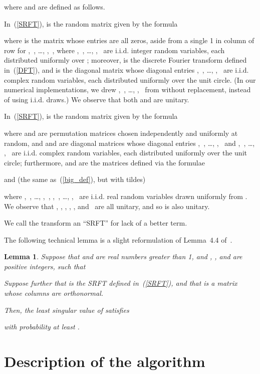 \documentclass[letterpaper,12pt]{article}
\newtheorem{lemma}[theorem]{Lemma}
\begin{document}
where  and  are defined as follows.

In~(\ref{SRFT}),  is the random matrix given by the formula

where  is the matrix whose entries are all zeros,
aside from a single 1 in column  of row 
for ,~, \dots, ,~,
where ,~, \dots, ,~ are
i.i.d. integer random variables,
each distributed uniformly over ;
moreover,  is the discrete Fourier transform
defined in~(\ref{DFT}),
and  is the diagonal matrix whose diagonal entries
,~, \dots, ,~ are i.i.d. complex random variables,
each distributed uniformly over the unit circle.
(In our numerical implementations,
we drew ,~, \dots, ,~
from  without replacement,
instead of using i.i.d. draws.)
We observe that both  and  are unitary.

In~(\ref{SRFT}),  is the random matrix given by the formula

where  and 
are permutation matrices chosen independently and uniformly at random, and
 and  are diagonal matrices
whose diagonal entries ,~, \dots, ,~
and ,~, \dots,
,~ are i.i.d. complex random variables,
each distributed uniformly over the unit circle; furthermore,
 and  are the matrices
defined via the formulae

and (the same as~(\ref{big_def}), but with tildes)

where ,~, \dots, ,~,
,~, \dots,
,~
are i.i.d. real random variables drawn uniformly from .
We observe that , ,
, ,
, and~ are all unitary,
and so  is also unitary.

We call the transform  an ``SRFT'' for lack of a better term.

The following technical lemma is a slight reformulation
of Lemma~4.4 of~\cite{woolfe-liberty-rokhlin-tygert}.

\begin{lemma}
\label{reformulation}
Suppose that  and  are real numbers greater than 1,
and , , and  are positive integers, such that

Suppose further that  is the SRFT defined in~(\ref{SRFT}),
and that  is a matrix whose columns are orthonormal.

Then, the least singular value  of 
satisfies

with probability at least .
\end{lemma}



\section{Description of the algorithm}
\label{algorithm}
\end{document}
